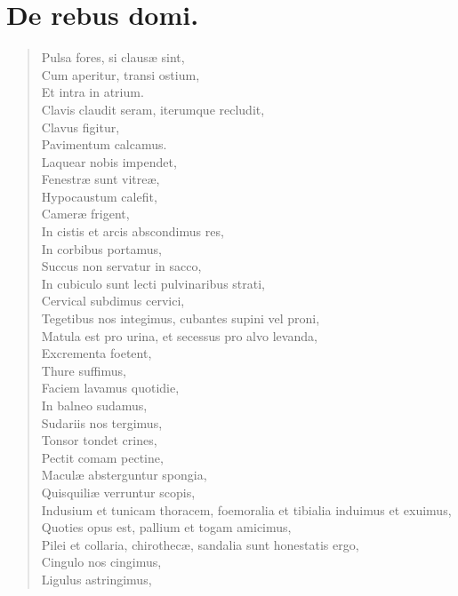 \chapter{De rebus domi.}


\begin{verse}

  Pulsa fores, si clausæ sint,\\
  Cum aperitur, transi ostium,\\
  Et intra in atrium.\\
  Clavis claudit seram, iterumque recludit,\\
  Clavus figitur,\\
  Pavimentum calcamus. \\
  Laquear nobis impendet,\\
  Fenestræ sunt vitreæ,\\
  Hypocaustum calefit,\\
  Cameræ frigent,\\
  In cistis et arcis abscondimus res,\\
  In corbibus portamus,\\
  Succus non servatur in sacco,\\
  In cubiculo sunt lecti pulvinaribus strati, \\
  Cervical subdimus cervici,\\
  Tegetibus nos integimus, cubantes supini vel proni,\\
  Matula est pro urina, et secessus pro alvo levanda,\\
  Excrementa foetent,\\
  Thure suffimus,\\
  Faciem lavamus quotidie,\\
  In balneo sudamus,\\
  Sudariis nos tergimus,\\
  Tonsor tondet crines,\\
  Pectit comam pectine,\\
  Maculæ absterguntur spongia,\\
  Quisquiliæ verruntur scopis,\\
  Indusium et tunicam thoracem, foemoralia et tibialia induimus et exuimus,\\
  Quoties opus est, pallium et togam amicimus,\\
  Pilei et collaria, chirothecæ, sandalia sunt honestatis ergo,\\
  Cingulo nos cingimus,\\
  Ligulus astringimus,\\

\end{verse}
